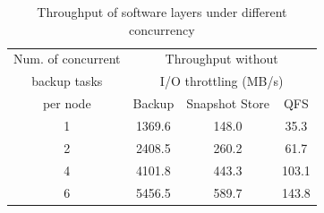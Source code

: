 \begin{table}[htbp]
    \centering
    \begin{tabular}{c|ccc}
    Num. of concurrent      & \multicolumn{3}{c}{Throughput without}    \\
    backup tasks            & \multicolumn{3}{c}{I/O throttling (MB/s)} \\ \cline{2-4}
    per node                & Backup                                     & Snapshot Store & QFS  \\ \hline
    1                       & 1369.6                                     & 148.0          & 35.3 \\
    2                       & 2408.5                                     & 260.2          & 61.7 \\
    4                       & 4101.8                                     & 443.3          & 103.1 \\
    6                       & 5456.5                                     & 589.7          & 143.8 \\
    \end{tabular}
\caption{Throughput of software layers under different concurrency}
\label{tab:throughput}
\end{table}

